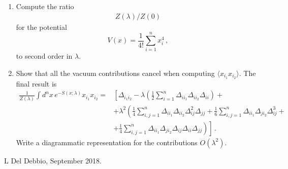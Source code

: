 \documentclass[12pt,a4paper]{article}
\begin{document}
\begin{enumerate}
\item   Compute the ratio 
\begin{align}
  Z(\lambda)/Z(0)
\end{align}
for the potential 
\begin{equation}
  \label{eq:QuarticPot}
  V(x) = \frac{1}{4!} \sum_{i=1}^n x_i^4\, ,
\end{equation}
to second order in $\lambda$.

\item Show that all the vacuum contributions cancel when computing
  $\langle x_{i_1} x_{i_2}\rangle$. The final result is
  \begin{align}
    \frac{1}{Z(\lambda)} \int d^nx\, e^{-S(x;\lambda)} 
    x_{i_1} x_{i_2} = & 
                             \left[
                             \Delta_{i_1 i_2} - \lambda  \left(\frac12 \sum_{i=1}^n
                             \Delta_{i i_1} \Delta_{i i_2} \Delta_{i i}\right) 
                             + \right. \nonumber \\
                           & \left.
                             + \lambda^2 \left( 
                             \frac{1}{4} \sum_{i,j=1}^n \Delta_{i i_1}
                             \Delta_{i i_2} \Delta_{i j}^2 \Delta_{jj}
                             + \frac{1}{6} \sum_{i,j=1}^n \Delta_{i i_1}
                             \Delta_{j i_2} \Delta_{i j}^3 +
                             \right. \right. \nonumber \\
    \label{eq:TwoPointNorm}
                           & + \left. \left.
                             \frac{1}{4} \sum_{i,j=1}^n \Delta_{i i_1}
                             \Delta_{j i_2} \Delta_{i j} \Delta_{ii}\Delta_{jj}
                             \right)
                             \right]\, .
  \end{align}
  Write a diagrammatic representation for the contributions $O(\lambda^2)$.

\end{enumerate}

\vfill
\hspace*{\fill}\tiny L Del Debbio, September 2018.
\end{document}
